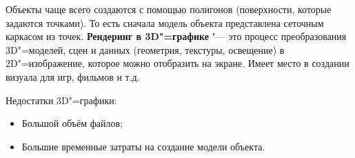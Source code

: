 Объекты чаще всего создаются с помощью полигонов (поверхности, которые задаются точками). То есть сначала модель объекта представлена сеточным каркасом из точек. \textbf{Рендеринг в 3D"=графике} "--- это процесс преобразования 3D"=моделей, сцен и данных (геометрия, текстуры, освещение) в 2D"=изображение, которое можно отобразить на экране. Имеет место в создании визуала для игр, фильмов и т.д.

Недостатки 3D"=графики:
\begin{itemize}
    \item Большой объём файлов;
    \item Большие временные затраты на создание модели объекта.
\end{itemize}